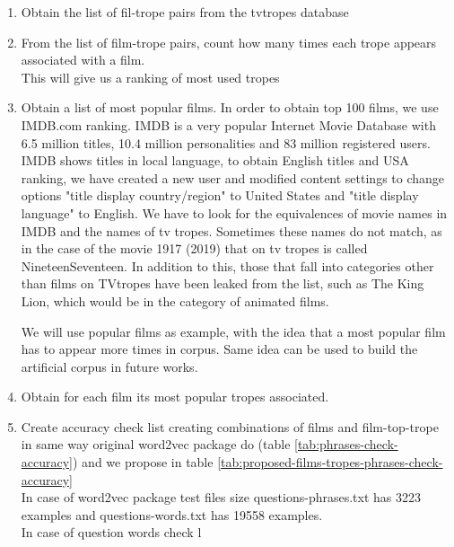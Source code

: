 \documentclass[letterpaper]{article}
\begin{document}
	\begin{enumerate}

	\item Obtain the list of fil-trope pairs from the tvtropes database\\
	\item From the list of film-trope pairs, count how many times each trope appears associated with a film.\\ This will give us a ranking of most used tropes\\
	\item Obtain a list of most popular films.
	In order to obtain top 100 films, we use IMDB.com ranking. IMDB is a very popular Internet Movie Database with 6.5 million titles, 10.4 million personalities and 83 million registered users. IMDB shows titles in local language, to obtain English titles and USA ranking, we have created a new user and modified content settings to change options "title display country/region" to United States and "title display language" to English. We have to look for the 
	equivalences of movie names in IMDB and the names of tv tropes. Sometimes these names do not match, as in the 
	case of the movie 1917 (2019) that on tv tropes is called NineteenSeventeen. In addition to this, those that fall into categories other than films on TVtropes have been leaked from the list, such as The King Lion, which would be in the category of animated films.
	
	
	We will use popular films as example, with the idea that a most popular film has to appear more times in corpus. Same idea can be used to build the artificial corpus in future works.\\
	\item Obtain for each film its most popular tropes associated.\\
	\item Create accuracy check list creating combinations of films and film-top-trope in same way original word2vec package do (table \ref{tab:phrases-check-accuracy}) and we propose in table \ref{tab:proposed-films-tropes-phrases-check-accuracy}\\ 
	
	In case of word2vec package test files size questions-phrases.txt has 3223 examples and questions-words.txt has 19558 examples.\\
	In case of question words check l
	
    \end{enumerate}
	
\end{document}
